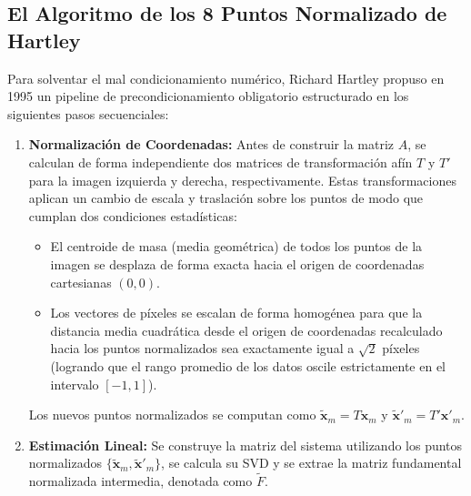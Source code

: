 \subsection{El Algoritmo de los 8 Puntos Normalizado de Hartley}
\noindent
Para solventar el mal condicionamiento numérico, Richard Hartley propuso en 1995 un pipeline de precondicionamiento obligatorio estructurado en los siguientes pasos secuenciales:

\begin{enumerate}
    \item \textbf{Normalización de Coordenadas:} Antes de construir la matriz $A$, se calculan de forma independiente dos matrices de transformación afín $T$ y $T'$ para la imagen izquierda y derecha, respectivamente. Estas transformaciones aplican un cambio de escala y traslación sobre los puntos de modo que cumplan dos condiciones estadísticas:
    \begin{itemize}
        \item El centroide de masa (media geométrica) de todos los puntos de la imagen se desplaza de forma exacta hacia el origen de coordenadas cartesianas $(0,0)$.
        \item Los vectores de píxeles se escalan de forma homogénea para que la distancia media cuadrática desde el origen de coordenadas recalculado hacia los puntos normalizados sea exactamente igual a $\sqrt{2}$ píxeles (logrando que el rango promedio de los datos oscile estrictamente en el intervalo $[-1, 1]$).
    \end{itemize}
    Los nuevos puntos normalizados se computan como $\tilde{\mathbf{x}}_m = T \mathbf{x}_m$ y $\tilde{\mathbf{x}}'_m = T' \mathbf{x}'_m$.
    
    \item \textbf{Estimación Lineal:} Se construye la matriz del sistema utilizando los puntos normalizados $\{\tilde{\mathbf{x}}_m, \tilde{\mathbf{x}}'_m\}$, se calcula su SVD y se extrae la matriz fundamental normalizada intermedia, denotada como $\tilde{F}$.
    

\end{enumerate}
